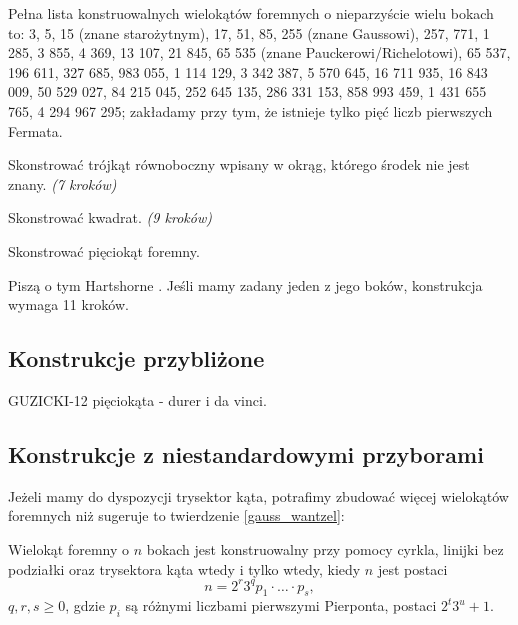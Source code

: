 Pełna lista konstruowalnych wielokątów foremnych o nieparzyście wielu bokach to: 3, 5, 15 (znane starożytnym), 17, 51, 85, 255 (znane Gaussowi), 257, 771, 1 285, 3 855, 4 369, 13 107, 21 845, 65 535 (znane Pauckerowi/Richelotowi), 65 537, 196 611, 327 685, 983 055, 1 114 129, 3 342 387, 5 570 645, 16 711 935, 16 843 009, 50 529 027, 84 215 045, 252 645 135, 286 331 153, 858 993 459, 1 431 655 765, 4 294 967 295; zakładamy przy tym, że istnieje tylko pięć liczb pierwszych Fermata.


\begin{problem}
    Skonstrować trójkąt równoboczny wpisany w okrąg, którego środek nie jest znany. \hfill \emph{(7 kroków)}
\end{problem}

\begin{problem}
    Skonstrować kwadrat. \hfill \emph{(9 kroków)}
\end{problem}

\begin{problem}
    Skonstrować pięciokąt foremny.
\end{problem}

Piszą o tym Hartshorne \cite[s. 45-49]{hartshorne2000}.
Jeśli mamy zadany jeden z jego boków, konstrukcja wymaga 11 kroków. %

\subsection{Konstrukcje przybliżone}
GUZICKI-12 pięciokąta - durer i da vinci.

\subsection{Konstrukcje z niestandardowymi przyborami}
Jeżeli mamy do dyspozycji trysektor kąta, potrafimy zbudować więcej wielokątów foremnych niż sugeruje to twierdzenie \ref{gauss_wantzel}:

\begin{proposition}
    Wielokąt foremny o $n$ bokach jest konstruowalny przy pomocy cyrkla, linijki bez podziałki oraz trysektora kąta wtedy i tylko wtedy, kiedy $n$ jest postaci
    \begin{equation}
        n = 2^r 3^q p_1 \cdot \ldots \cdot p_s,
    \end{equation}
    $q, r, s \ge 0$, gdzie $p_i$ są różnymi liczbami pierwszymi Pierponta, postaci $2^t3^u + 1$.
\end{proposition}

